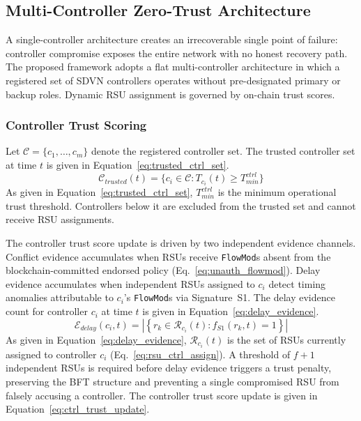 \documentclass[12pt, a4paper]{report}
\begin{document}
{{\subsection{Multi-Controller Zero-Trust Architecture}
\label{sec:multi_ctrl}


A single-controller architecture creates an irrecoverable
single point of failure: controller compromise exposes the
entire network with no honest recovery path. The proposed
framework adopts a flat multi-controller architecture in
which a registered set of \ac{SDVN} controllers operates
without pre-designated primary or backup roles. Dynamic
\ac{RSU} assignment is governed by on-chain trust scores.



\subsubsection{Controller Trust Scoring}
Let $\mathcal{C}{=}\{c_1,\ldots,c_m\}$ denote the
registered controller set. The trusted controller set
at time $t$ is given in
Equation~\eqref{eq:trusted_ctrl_set}.
\begin{equation}
\mathcal{C}_{trusted}(t){=}
\{c_i\in\mathcal{C}:T_{c_i}(t)\geq T_{min}^{ctrl}\}
\label{eq:trusted_ctrl_set}
\end{equation}
As given in Equation~\eqref{eq:trusted_ctrl_set},
$T_{min}^{ctrl}$ is the minimum operational trust
threshold. Controllers below it are excluded from the
trusted set and cannot receive \ac{RSU} assignments.


The controller trust score update is driven by two
independent evidence channels. Conflict evidence
accumulates when RSUs receive \texttt{FlowMod}s absent
from the blockchain-committed endorsed policy
(Eq.~\ref{eq:unauth_flowmod}). Delay evidence
accumulates when independent RSUs assigned to $c_i$
detect timing anomalies attributable to $c_i$'s
\texttt{FlowMod}s via Signature~S1. The delay
evidence count for controller $c_i$ at time $t$ is
given in Equation~\eqref{eq:delay_evidence}.
\begin{equation}
\mathcal{E}_{delay}(c_i,t) =
\left|\left\{
r_k \in \mathcal{R}_{c_i}(t) :
f_{S1}(r_k,t) = 1
\right\}\right|
\label{eq:delay_evidence}
\end{equation}
As given in Equation~\eqref{eq:delay_evidence},
$\mathcal{R}_{c_i}(t)$ is the set of \ac{RSU}s
currently assigned to controller $c_i$
(Eq.~\ref{eq:rsu_ctrl_assign}). A threshold of
$f{+}1$ independent \ac{RSU}s is required before
delay evidence triggers a trust penalty, preserving
the \ac{BFT} structure and preventing a single
compromised \ac{RSU} from falsely accusing a
controller. The controller trust score update is
given in Equation~\eqref{eq:ctrl_trust_update}.


}}
\end{document}
